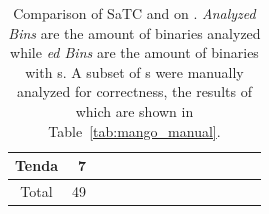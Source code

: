 \begin{table}[tb]
\begin{adjustbox}{width=\textwidth}
\begin{tabular}{cr:rrrrrr:rrrrrr}
			Tenda                   & 7                             &
			\satcCompTendaAlerts    & \satcCompTendaCmdInjAlerts    & \satcCompTendaOverflowAlerts        & \satcCompTendaTime                      & \satcCompTendaAnalyzedBins    & \satcCompTendaAlertedBins    &
			\mangoCompTendaAlerts   & \mangoCompTendaCmdInjAlerts   & \mangoCompTendaOverflowAlerts       & \mangoCompTendaTime                     & \mangoCompTendaAnalyzedBins   & \mangoCompTendaAlertedBins                           \\
			\hline
			Total                   & 49                            &
			\satcCompTotalAlerts    & \satcCompTotalCmdInjAlerts    & \satcCompTotalOverflowAlerts        & \satcCompTotalTime                      & \satcCompTotalAnalyzedBins    & \satcCompTotalAlertedBins    &
			\mangoCompTotalAlerts   & \mangoCompTotalCmdInjAlerts   & \mangoCompTotalOverflowAlerts       & \mangoCompTotalTime                     & \mangoCompTotalAnalyzedBins   & \mangoCompTotalAlertedBins                           \\
			\hline
		\end{tabular}
	\end{adjustbox}
	\caption{Comparison of SaTC and \toolname on \karonteDataset.
		\textit{Analyzed Bins} are the amount of binaries \toolname analyzed while \textit{\trupoc{}ed Bins} are the amount of binaries with \trupoc{}s.
		A subset of \trupoc{}s were manually analyzed for correctness, the results of which are shown in Table~\ref{tab:mango_manual}. \\
	}
	\label{tab:mango_satc}
\end{table}

